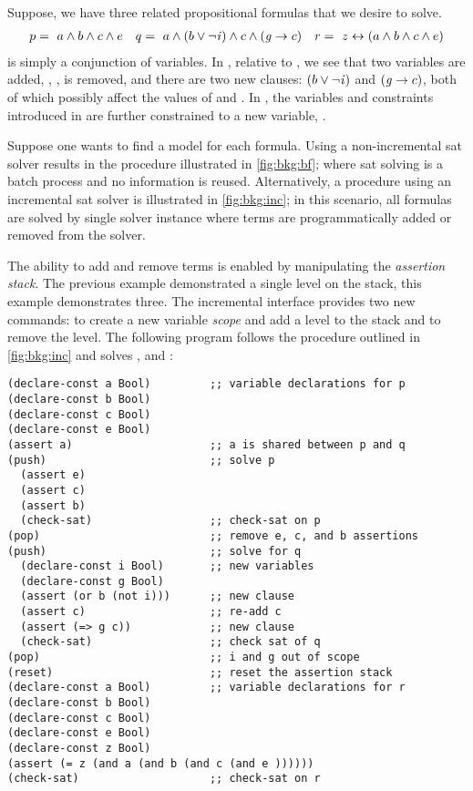 \label{section:background-incremental}
%
%

%
%
Suppose, we have three related propositional formulas that we desire to solve.
%
\begin{align*}
  p =\ a \wedge b \wedge c \wedge e && q=\ a \wedge (b \vee \neg \mathit{i}{}) \wedge c \wedge (\mathit{g}{} \rightarrow c) && r =~z \leftrightarrow (a \wedge b \wedge c \wedge e)
\end{align*}
%
\pV{} is simply a conjunction of variables. In \qV{}, relative to \pV{}, we see
that two variables are added, \iV{}, \gV{}, \eV{} is removed, and there are two
new clauses: $(b \vee \neg \mathit{i}{})$ and $(\mathit{g}{} \rightarrow c)$, both of which
possibly affect the values of \bV{} and \cV{}. In \rV{}, the variables and
constraints introduced in \pV{} are further constrained to a new variable,
\zV{}.

Suppose one wants to find a model for each formula. Using a non-incremental
\ac{sat} solver results in the procedure illustrated in \autoref{fig:bkg:bf};
where \ac{sat} solving is a batch process and no information is reused.
Alternatively, a procedure using an incremental \ac{sat} solver is illustrated
in \autoref{fig:bkg:inc}; in this scenario, all formulas are solved by single
solver instance where terms are programmatically added or removed from the
solver.

The ability to add and remove terms is enabled by manipulating the
\textit{assertion stack}. The previous example demonstrated a single level on
the stack, this example demonstrates three. The incremental interface provides
two new commands:  to create a new variable \emph{scope} and add a
level to the stack and  to remove the level. The following program
follows the procedure outlined in \autoref{fig:bkg:inc} and solves \pV, \qV{}
and \rV{}:

\begin{lstlisting}[columns=flexible,keepspaces=true,language=SMTLIB]
(declare-const a Bool)         ;; variable declarations for p
(declare-const b Bool)
(declare-const c Bool)
(declare-const e Bool)
(assert a)                     ;; a is shared between p and q
(push)                         ;; solve p
  (assert e)
  (assert c)
  (assert b)
  (check-sat)                  ;; check-sat on p
(pop)                          ;; remove e, c, and b assertions
(push)                         ;; solve for q
  (declare-const i Bool)       ;; new variables
  (declare-const g Bool)
  (assert (or b (not i)))      ;; new clause
  (assert c)                   ;; re-add c
  (assert (=> g c))            ;; new clause
  (check-sat)                  ;; check sat of q
(pop)                          ;; i and g out of scope
(reset)                        ;; reset the assertion stack
(declare-const a Bool)         ;; variable declarations for r
(declare-const b Bool)
(declare-const c Bool)
(declare-const e Bool)
(declare-const z Bool)
(assert (= z (and a (and b (and c (and e ))))))
(check-sat)                    ;; check-sat on r
\end{lstlisting}

